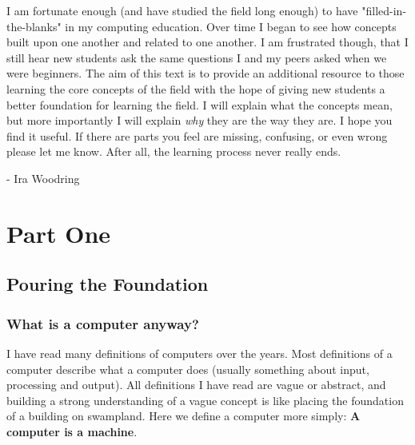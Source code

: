 \documentclass[11pt,fleqn]{book} %
\begin{document}
I am fortunate enough (and have studied the field long enough) to have "filled-in-the-blanks" in my computing education.  Over time I began to see how concepts built upon one another and related to one another.  I am frustrated though, that I still hear new students ask the same questions I and my peers asked when we were beginners.  The aim of this text is to provide an additional resource to those learning the core concepts of the field with the hope of giving new students a better foundation for learning the field.  I will explain what the concepts mean, but more importantly I will explain \textit{why} they are the way they are.  I hope you find it useful.  If there are parts you feel are missing, confusing, or even wrong please let me know.  After all, the learning process never really ends.

- Ira Woodring 



\part{Part One}



\chapter{Pouring the Foundation}

\section{What is a computer anyway?}

I have read many definitions of computers over the years.  Most definitions of a computer describe what a computer  does (usually something about input, processing and output).  All definitions I have read are vague or abstract, and building a strong understanding of a vague concept is like placing the foundation of a building on swampland.  Here we define a computer  more simply:  \textbf{A computer is a machine}.
\end{document}
